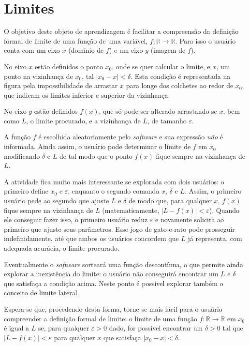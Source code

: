 \documentclass{article}
\newcommand\foreign[1]{\textsl{#1}}
\begin{document}
\section*{Limites}

O objetivo deste objeto de aprendizagem é facilitar a compreensão da definição formal de limite de uma função de uma variável, $f : \mathbb{R} \to \mathbb{R}$. Para isso o usuário conta com um eixo $x$ (domínio de $f$) e um eixo $y$ (imagem de $f$).

No eixo $x$ estão definidos o ponto $x_0$, onde se quer calcular o limite, e $x$, um ponto na vizinhança de $x_0$, tal $|x_0 - x| < \delta$. Esta condição é representada na figura pela impossibilidade de arrastar $x$ para longe dos colchetes ao redor de $x_0$, que indicam os limites inferior e superior da vizinhança.

No eixo $y$ estão definidos $f(x)$, que só pode ser alterado arrastando-se $x$, bem como $L$, o limite procurado, e a vizinhança de $L$, de tamanho $\varepsilon$.

A função $f$ é escolhida aleatoriamente pelo \foreign{software} e sua expressão \emph{não} é informada. Ainda assim, o usuário pode determinar o limite de $f$ em $x_0$ modificando $\delta$ e $L$ de tal modo que o ponto $f(x)$ fique sempre na vizinhança de $L$.

A atividade fica muito mais interessante se explorada com dois usuários: o primeiro define $x_0$ e $\varepsilon$, enquanto o segundo comanda $x$, $\delta$ e $L$. Assim, o primeiro usuário pede ao segundo que ajuste $L$ e $\delta$ de modo que, para qualquer $x$, $f(x)$ fique sempre na vizinhança de $L$ (matematicamente, $|L - f(x)| < \varepsilon$). Quando ele conseguir fazer isso, o primeiro usuário reduz $\varepsilon$ e novamente solicita ao primeiro que ajuste seus parâmetros. Esse jogo de gato-e-rato pode prosseguir indefinidamente, até que ambos os usuários concordem que $L$ já representa, com adequada acurácia, o limite procurado.

Eventualmente o \foreign{software} sorteará uma função descontínua, o que permite ainda explorar a inexistência do limite: o usuário não conseguirá encontrar um $L$ e $\delta$ que satisfaça a condição acima. Neste ponto é possível explorar também o conceito de limite lateral.

Espera-se que, procedendo desta forma, torne-se mais fácil para o usuário compreender a definição formal de limite: o limite de uma função $f : \mathbb{R} \to \mathbb{R}$ em $x_0$ é igual a $L$ se, para qualquer $\varepsilon > 0$ dado, for possível encontrar um $\delta > 0$ tal que $|L - f(x)| < \varepsilon$ para qualquer $x$ que satisfaça $|x_0 - x| < \delta$.
\end{document}

